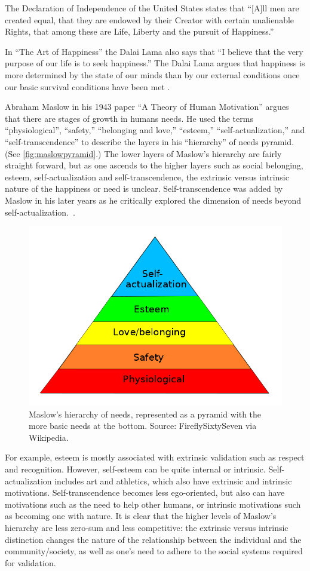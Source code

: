 The Declaration of Independence of the United States states that ``[A]ll men are created equal, that they are endowed by their Creator with certain unalienable Rights, that among these are Life, Liberty and the pursuit of Happiness.''

In ``The Art of Happiness'' the Dalai Lama also says that ``I believe that the very purpose of our life is to seek happiness.'' The Dalai Lama argues that happiness is more determined by the state of our minds than by our external conditions once our basic survival conditions have been met \cite{lama2009art}.

Abraham Maslow in his 1943 paper ``A Theory of Human Motivation'' argues that there are stages of growth in humans needs. He used the terms ``physiological'', ``safety,'' ``belonging and love,'' ``esteem,'' ``self-actualization,'' and ``self-transcendence'' to describe the layers in his ``hierarchy'' of needs pyramid\cite{maslow_theory_1943}. (See \autoref{fig:maslowpyramid}.) The lower layers of Maslow's hierarchy are fairly straight forward, but as one ascends to the higher layers such as social belonging, esteem, self-actualization and self-transcendence, the extrinsic versus intrinsic nature of the happiness or need is unclear. Self-transcendence was added by Maslow in his later years as he critically explored the dimension of needs beyond self-actualization.\ \cite{maslow1991critique}.

\begin{figure}[t]
 \centering
 \includegraphics[width=.5\textwidth]{pictures/MaslowsHierarchyOfNeeds}
 \caption[Maslow's hierarchy of needs]{Maslow's hierarchy of needs, represented as a pyramid with the more basic needs at the bottom. Source: FireflySixtySeven via Wikipedia. \ccbysa}
 \label{fig:maslowpyramid}
\end{figure}

For example, esteem is mostly associated with extrinsic validation such as respect and recognition. However, self-esteem can be quite internal or intrinsic. Self-actualization includes art and athletics, which also have extrinsic and intrinsic motivations. Self-transcendence becomes less ego-oriented, but also can have motivations such as the need to help other humans, or intrinsic motivations such as becoming one with nature. It is clear that the higher levels of Maslow's hierarchy are less zero-sum and less competitive: the extrinsic versus intrinsic distinction changes the nature of the relationship between the individual and the community/society, as well as one's need to adhere to the social systems required for validation.

